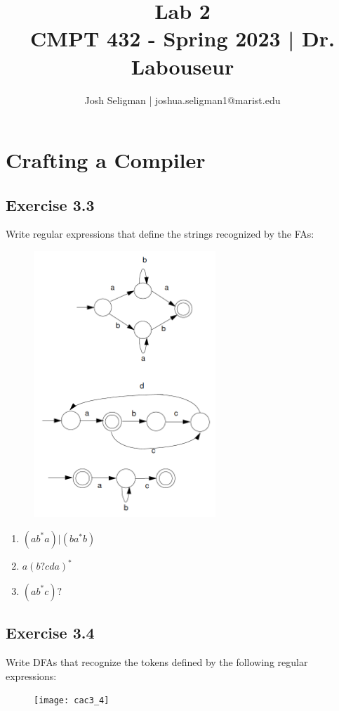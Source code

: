\documentclass[letterpaper, 10pt, DIV=13]{scrartcl}
\title {
	\normalfont
	\huge{Lab 2} \\
	\vspace{10pt}
	\large{CMPT 432 - Spring 2023 | Dr. Labouseur}
}
\author{\normalfont Josh Seligman | joshua.seligman1@marist.edu}
\numberwithin{equation}{section}
\numberwithin{figure}{section}
\numberwithin{table}{section}
\begin{document}
\maketitle

\section{Crafting a Compiler}
\subsection{Exercise 3.3}
Write regular expressions that define the strings recognized by the FAs: \\
\begin{figure}[ht]
    \centering
    \includegraphics[height=10cm]{cac3_3}
\end{figure}
\begin{enumerate}
    \item $(ab^*a)|(ba^*b)$
    \item $a(b?cda)^*$
    \item $(ab^*c)?$
\end{enumerate}

\subsection{Exercise 3.4}
Write DFAs that recognize the tokens defined by the following regular expressions:
\begin{figure}[ht]
    \centering
    \texttt{[image: cac3\_4]}
\end{figure}
\end{document}

